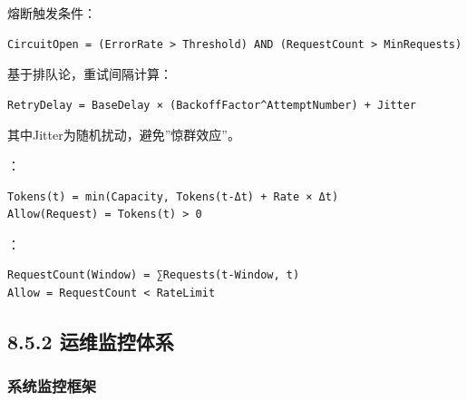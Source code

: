 熔断触发条件：

\begin{lstlisting}
CircuitOpen = (ErrorRate > Threshold) AND (RequestCount > MinRequests)
\end{lstlisting}


基于排队论，重试间隔计算：

\begin{lstlisting}
RetryDelay = BaseDelay × (BackoffFactor^AttemptNumber) + Jitter
\end{lstlisting}

其中Jitter为随机扰动，避免''惊群效应''。


：

\begin{lstlisting}
Tokens(t) = min(Capacity, Tokens(t-Δt) + Rate × Δt)
Allow(Request) = Tokens(t) > 0
\end{lstlisting}

：

\begin{lstlisting}
RequestCount(Window) = ∑Requests(t-Window, t)
Allow = RequestCount < RateLimit
\end{lstlisting}

\hypertarget{ux8fd0ux7ef4ux76d1ux63a7ux4f53ux7cfb}{%
\subsection{8.5.2 运维监控体系}\label{ux8fd0ux7ef4ux76d1ux63a7ux4f53ux7cfb}}

\hypertarget{ux7cfbux7edfux76d1ux63a7ux6846ux67b6}{%
\subsubsection{系统监控框架}\label{ux7cfbux7edfux76d1ux63a7ux6846ux67b6}}

